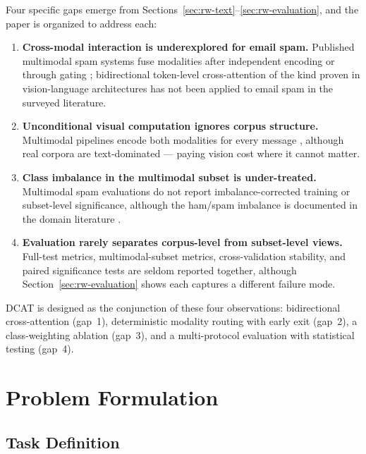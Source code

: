 \documentclass[10pt,twoside]{article}
\begin{document}
Four specific gaps emerge from Sections~\ref{sec:rw-text}--\ref{sec:rw-evaluation}, and the paper is organized to address each:

\begin{enumerate}
\item \textbf{Cross-modal interaction is underexplored for email spam.} Published multimodal spam systems fuse modalities after independent encoding \citep{zhang2023mmtd} or through gating \citep{arevalo2017gmu}; bidirectional token-level cross-attention of the kind proven in vision-language architectures \citep{lu2019vilbert} has not been applied to email spam in the surveyed literature.
\item \textbf{Unconditional visual computation ignores corpus structure.} Multimodal pipelines encode both modalities for every message \citep{zhang2023mmtd}, although real corpora are text-dominated \citep{janez2023review,spamassassin2006} --- paying vision cost where it cannot matter.
\item \textbf{Class imbalance in the multimodal subset is under-treated.} Multimodal spam evaluations do not report imbalance-corrected training or subset-level significance, although the ham/spam imbalance is documented in the domain literature \citep{janez2023review,annadatha2018image}.
\item \textbf{Evaluation rarely separates corpus-level from subset-level views.} Full-test metrics, multimodal-subset metrics, cross-validation stability, and paired significance tests are seldom reported together, although Section~\ref{sec:rw-evaluation} shows each captures a different failure mode.
\end{enumerate}

DCAT is designed as the conjunction of these four observations: bidirectional cross-attention (gap~1), deterministic modality routing with early exit (gap~2), a class-weighting ablation (gap~3), and a multi-protocol evaluation with statistical testing (gap~4).

\section{Problem Formulation}\label{sec:formulation}

\subsection{Task Definition}\label{sec:task}
\end{document}
